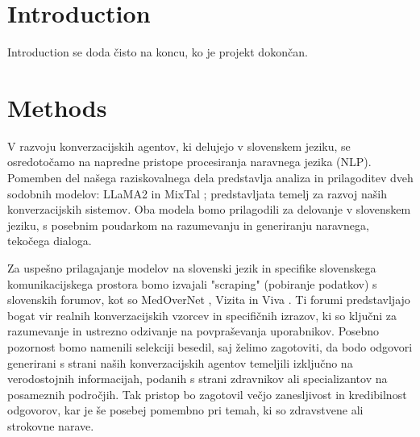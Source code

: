 \documentclass[fleqn,moreauthors,10pt]{ds_report}
\affiliation{\textit{Advisor: Slavko Žitnik}}
\begin{document}
\flushbottom 

\maketitle 

\thispagestyle{empty} 


\section*{Introduction}
Introduction se doda čisto na koncu, ko je projekt dokončan.


\section*{Methods}
V razvoju konverzacijskih agentov, ki delujejo v slovenskem jeziku, se osredotočamo na napredne pristope procesiranja naravnega jezika (NLP). Pomemben del našega raziskovalnega dela predstavlja analiza in prilagoditev dveh sodobnih modelov: LLaMA2 \cite{touvron2023llama} in MixTal \cite{jiang2024mixtral}; predstavljata temelj za razvoj naših konverzacijskih sistemov. Oba modela bomo prilagodili za delovanje v slovenskem jeziku, s posebnim poudarkom na razumevanju in generiranju naravnega, tekočega dialoga.

Za uspešno prilagajanje modelov na slovenski jezik in specifike slovenskega komunikacijskega prostora bomo izvajali "scraping" (pobiranje podatkov) s slovenskih forumov, kot so MedOverNet \cite{medovernet}, Vizita \cite{vizita} in Viva \cite{viva}. Ti forumi predstavljajo bogat vir realnih konverzacijskih vzorcev in specifičnih izrazov, ki so ključni za razumevanje in ustrezno odzivanje na povpraševanja uporabnikov. Posebno pozornost bomo namenili selekciji besedil, saj želimo zagotoviti, da bodo odgovori generirani s strani naših konverzacijskih agentov temeljili izključno na verodostojnih informacijah, podanih s strani zdravnikov ali specializantov na posameznih področjih. Tak pristop bo zagotovil večjo zanesljivost in kredibilnost odgovorov, kar je še posebej pomembno pri temah, ki so zdravstvene ali strokovne narave.
\end{document}
